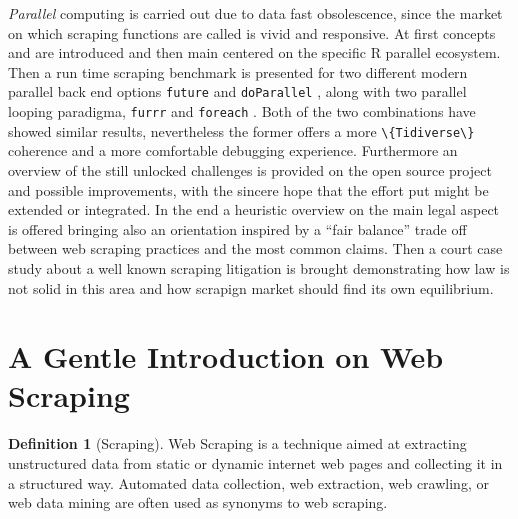\documentclass[
  12pt,
  a4paper,
  oneside]{book}
\newcommand{\passthrough}[1]{#1}
\theoremstyle{definition}
\newtheorem{definition}{Definition}[chapter]
\theoremstyle{definition}
\theoremstyle{definition}
\theoremstyle{remark}
\begin{document}
\emph{Parallel} computing is carried out due to data fast obsolescence, since the market on which scraping functions are called is vivid and responsive. At first concepts and are introduced and then main centered on the specific R parallel ecosystem. Then a run time scraping benchmark is presented for two different modern parallel back end options \passthrough{\lstinline!future!} \citet{future} and \passthrough{\lstinline!doParallel!} \citet{doParallel}, along with two parallel looping paradigma, \passthrough{\lstinline!furrr!} \citet{furrr} and \passthrough{\lstinline!foreach!} \citet{foreach}. Both of the two combinations have showed similar results, nevertheless the former offers a more \passthrough{\lstinline!\{Tidiverse\}!} coherence and a more comfortable debugging experience.
Furthermore an overview of the still unlocked challenges is provided on the open source project and possible improvements, with the sincere hope that the effort put might be extended or integrated. In the end a heuristic overview on the main legal aspect is offered bringing also an orientation inspired by a ``fair balance'' trade off between web scraping practices and the most common claims. Then a court case study about a well known scraping litigation is brought demonstrating how law is not solid in this area and how scrapign market should find its own equilibrium.

\hypertarget{reverse}{%
\section{A Gentle Introduction on Web Scraping}\label{reverse}}

\begin{definition}[Scraping]
\protect\hypertarget{def:scraping}{}{\label{def:scraping} {} }Web Scraping is a technique aimed at extracting unstructured data from static or dynamic internet web pages and collecting it in a structured way.
Automated data collection, web extraction, web crawling, or web data mining are often used as synonyms to web scraping.
\end{definition}
\end{document}
